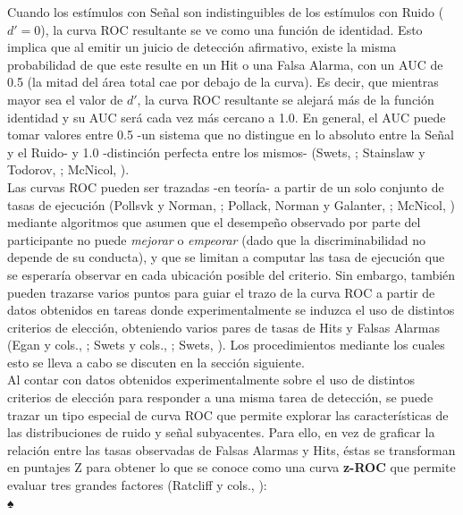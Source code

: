 Cuando los estímulos con Señal son indistinguibles de los estímulos con Ruido ($d' = 0$), la curva ROC resultante se ve como una función de identidad. Esto implica que al emitir un juicio de detección afirmativo, existe la misma probabilidad de que este resulte en un Hit o una Falsa Alarma, con un AUC de 0.5 (la mitad del área total cae por debajo de la curva). Es decir, que mientras mayor sea el valor de $d'$, la curva ROC resultante se alejará más de la función identidad y su AUC será cada vez más cercano a 1.0. En general, el AUC puede tomar valores entre 0.5 -un sistema que no distingue en lo absoluto entre la Señal y el Ruido- y 1.0 -distinción perfecta entre los mismos- (Swets, \citeyear{Swets1973}; Stainslaw y Todorov, \citeyear{Stainslaw1999}; McNicol, \citeyear{McNicol5}).\\

Las curvas ROC pueden ser trazadas -en teoría- a partir de un solo conjunto de tasas de ejecución (Pollsvk y Norman, \citeyear{Pollack1964a}; Pollack, Norman y Galanter, \citeyear{Pollack1964b}; McNicol, \citeyear{McNicol2}) mediante algoritmos que asumen que el desempeño observado por parte del participante no puede \textit{mejorar} o \textit{empeorar} (dado que la discriminabilidad no depende de su conducta), y que se limitan a computar las tasa de ejecución que se esperaría observar en cada ubicación posible del criterio. Sin embargo, también pueden trazarse varios puntos para guiar el trazo de la curva ROC a partir de datos obtenidos en tareas donde experimentalmente se induzca el uso de distintos criterios de elección, obteniendo varios pares de tasas de Hits y Falsas Alarmas (Egan y cols., \citeyear{Egan1959}; Swets y cols., \citeyear{Swets1961}; Swets, \citeyear{Swets1986}). Los procedimientos mediante los cuales esto se lleva a cabo se discuten en la sección siguiente.\\

Al contar con datos obtenidos experimentalmente sobre el uso de distintos criterios de elección para responder a una misma tarea de detección, se puede trazar un tipo especial de curva ROC que permite explorar las características de las distribuciones de ruido y señal subyacentes. Para ello, en vez de graficar la relación entre las tasas observadas de Falsas Alarmas y Hits, éstas se transforman en puntajes Z para obtener lo que se conoce como una curva \textbf{z-ROC} que permite evaluar tres grandes factores (Ratcliff y cols., \citeyear{Ratcliff1992}):\\♠

